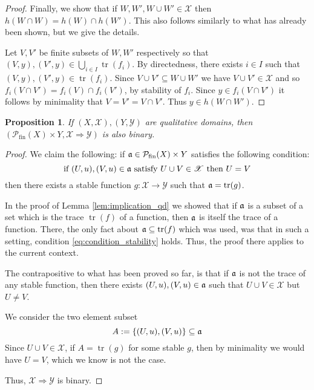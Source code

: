 \documentclass[12pt]{article}
\theoremstyle{plain}
\newtheorem{proposition}[thm]{Proposition}
\theoremstyle{definition}
\newcommand{\scr}[1]{\mathscr{#1}}
\newcommand{\call}[1]{\mathcal{#1}}
\newcommand{\lto}{\longrightarrow}
\begin{document}
\begin{proof}
		Finally, we show that if $W, W', W \cup W' \in \scr{X}$ then $h(W \cap W) = h(W) \cap h(W')$. This also follows similarly to what has already been shown, but we give the details.
		
		Let $V,V'$ be finite subsets of $W,W'$ respectively so that $(V,y), (V',y) \in \bigcup_{i \in I}\operatorname{tr}(f_i)$. By directedness, there exists $i \in I$ such that $(V,y), (V',y) \in \operatorname{tr}(f_i)$. Since $V \cup V' \subseteq W \cup W'$ we have $V \cup V' \in \scr{X}$ and so $ f_i(V \cap V') = f_i(V) \cap f_i(V') $, by stability of $f_i$. Since $y \in f_i(V \cap V')$ it follows by minimality that $V = V' = V \cap V'$. Thus $y \in h(W \cap W')$.
		\end{proof}
	
	\begin{proposition}\label{prop:abs_binary}
		If $(X,\scr{X}), (Y, \scr{Y})$ are qualitative domains, then $(\call{P}_{\text{fin}}(X) \times Y, \scr{X} \Rightarrow \scr{Y})$ is also binary.
		\end{proposition}
	\begin{proof}
		We claim the following: if $\frak{a} \in \call{P}_{\text{fin}}(X) \times Y$ satisfies the following condition:
		\begin{equation}\label{eq:condition_stability}
			\text{if } (U,u),(V,u) \in \frak{a}\text{ satisfy }U \cup V \in \scr{X}\text{ then }U = V
			\end{equation}
		then there exists a stable function $g: \scr{X} \lto \scr{Y}$ such that $\frak{a} = \operatorname{tr}(g)$.
		
		In the proof of Lemma \ref{lem:implication_qd} we showed that if $\frak{a}$ is a subset of a set which is the trace $\operatorname{tr}(f)$ of a function, then $\frak{a}$ is itself the trace of a function. There, the only fact about $\frak{a} \subseteq \operatorname{tr}(f)$ which was used, was that in such a setting, condition \eqref{eq:condition_stability} holds. Thus, the proof there applies to the current context.
		
		The contrapositive to what has been proved so far, is that if $\frak{a}$ is not the trace of any stable function, then there exists $(U,u), (V,u) \in \frak{a}$ such that $U \cup V \in \scr{X}$ but $U \neq V$.
		
		We consider the two element subset
		\begin{equation}
			A := \{ (U, u), (V,u) \} \subseteq \frak{a}
			\end{equation}
		Since $U \cup V \in \scr{X}$, if $A = \operatorname{tr}(g)$ for some stable $g$, then by minimality we would have $U = V$, which we know is not the case.
		
		Thus, $\scr{X} \Rightarrow \scr{Y}$ is binary.
		\end{proof}
	
\end{document}
